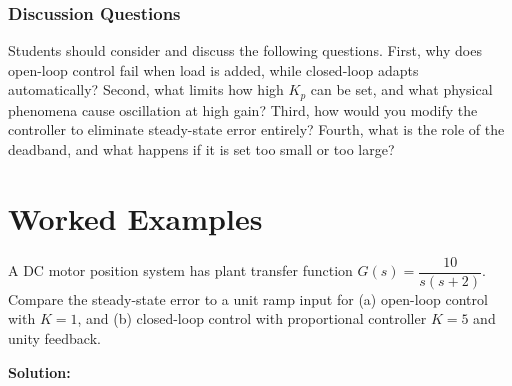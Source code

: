 \subsubsection{Discussion Questions}
Students should consider and discuss the following questions. First, why does open-loop control fail when load is added, while closed-loop adapts automatically? Second, what limits how high $K_p$ can be set, and what physical phenomena cause oscillation at high gain? Third, how would you modify the controller to eliminate steady-state error entirely? Fourth, what is the role of the deadband, and what happens if it is set too small or too large?

\section{Worked Examples}
\label{sec:examples}

\begin{examplebox}
A DC motor position system has plant transfer function $G(s) = \dfrac{10}{s(s+2)}$. Compare the steady-state error to a unit ramp input for (a) open-loop control with $K = 1$, and (b) closed-loop control with proportional controller $K = 5$ and unity feedback.

\textbf{Solution:}
\end{examplebox}

